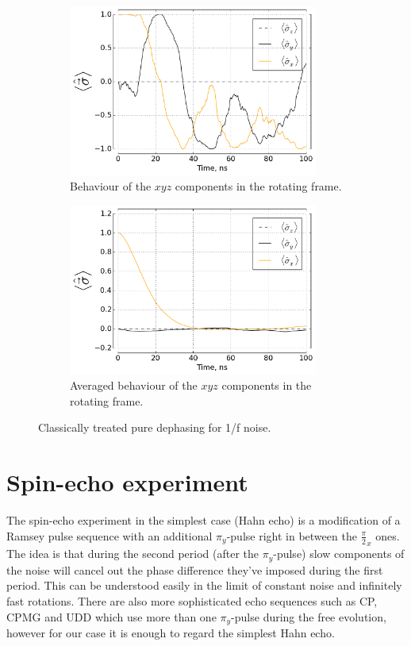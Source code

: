 \documentclass[12pt]{report}
\numberwithin{equation}{section}
\begin{document}
\begin{figure}
\begin{subfigure}[t]{0.45\textwidth}
\centering
\includegraphics[width=0.9\textwidth]{cdeph_xyz_rf_pink}
\caption{Behaviour of the $xyz$ components in the rotating frame.}
\end{subfigure}
\begin{subfigure}[t]{0.45\textwidth}
\centering
\includegraphics[width=0.9\textwidth]{cdeph_xyz_rf_avg_pink}
\caption{Averaged behaviour of the $xyz$ components in the rotating frame.}
\end{subfigure}
\caption{Classically treated pure dephasing for 1/f noise.}
\label{fig:cdeph_pink}
\endgroup
\end{figure}

\section{Spin-echo experiment}

The spin-echo experiment in the simplest case (Hahn echo) is a modification of a Ramsey pulse sequence with an additional $\pi_y$-pulse right in between the $\frac{\pi}{2}_x$ ones. The idea is that during the second period (after the $\pi_y$-pulse)  slow components of the noise will cancel out the phase difference they've imposed during the first period. This can be understood easily in the limit of constant noise and infinitely fast rotations. There are also more sophisticated echo sequences such as CP, CPMG and UDD\cite{Bylander2011} which use more than one $\pi_y$-pulse during the free evolution, however for our case it is enough to regard the simplest Hahn echo.
\end{document}
